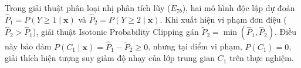 Trong giải thuật phân loại nhị phân tích lũy ($E_{7b}$), hai mô hình độc lập dự đoán $\hat{P}_1 = P(Y \ge 1 \mid \mathbf{x})$ và $\hat{P}_2 = P(Y \ge 2 \mid \mathbf{x})$. Khi xuất hiện vi phạm đơn điệu ($\hat{P}_2 > \hat{P}_1$), giải thuật Isotonic Probability Clipping gán $\tilde{P}_2 = \min(\hat{P}_1, \hat{P}_2)$. Điều này bảo đảm $P(C_1 \mid \mathbf{x}) = \hat{P}_1 - \tilde{P}_2 \ge 0$, nhưng tại điểm vi phạm, $P(C_1) = 0$, giải thích hiện tượng suy giảm độ nhạy của lớp trung gian $C_1$ trên thực nghiệm.
